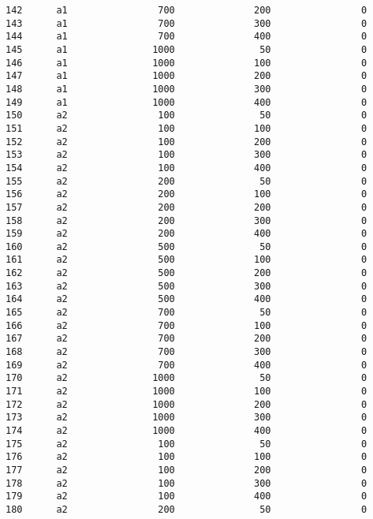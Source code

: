 \documentclass[11pt]{article}
\begin{document}
\begin{Verbatim}[commandchars=\\\{\}]
142      a1                700              200                0   
143      a1                700              300                0   
144      a1                700              400                0   
145      a1               1000               50                0   
146      a1               1000              100                0   
147      a1               1000              200                0   
148      a1               1000              300                0   
149      a1               1000              400                0   
150      a2                100               50                0   
151      a2                100              100                0   
152      a2                100              200                0   
153      a2                100              300                0   
154      a2                100              400                0   
155      a2                200               50                0   
156      a2                200              100                0   
157      a2                200              200                0   
158      a2                200              300                0   
159      a2                200              400                0   
160      a2                500               50                0   
161      a2                500              100                0   
162      a2                500              200                0   
163      a2                500              300                0   
164      a2                500              400                0   
165      a2                700               50                0   
166      a2                700              100                0   
167      a2                700              200                0   
168      a2                700              300                0   
169      a2                700              400                0   
170      a2               1000               50                0   
171      a2               1000              100                0   
172      a2               1000              200                0   
173      a2               1000              300                0   
174      a2               1000              400                0   
175      a2                100               50                0   
176      a2                100              100                0   
177      a2                100              200                0   
178      a2                100              300                0   
179      a2                100              400                0   
180      a2                200               50                0   

\end{Verbatim}
\end{document}
